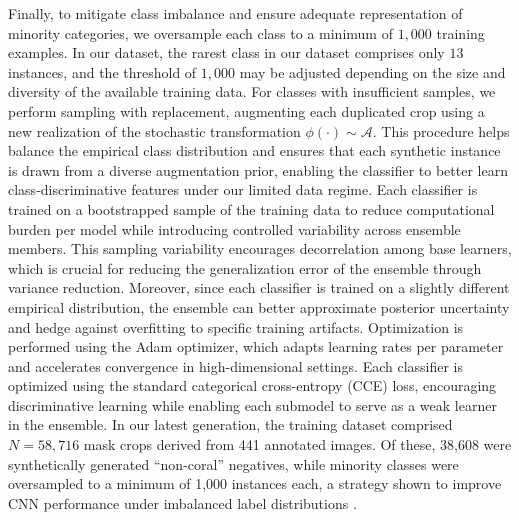 \documentclass[11pt]{elsarticle}
\begin{document}
Finally, to mitigate class imbalance and ensure adequate representation of minority categories, we oversample each class to a minimum of $1{,}000$ training examples. In our dataset, the rarest class in our dataset comprises only $13$ instances, and the threshold of $1,000$ may be adjusted depending on the size and diversity of the available training data. For classes with insufficient samples, we perform sampling with replacement, augmenting each duplicated crop using a new realization of the stochastic transformation $\phi(\cdot) \sim \mathcal{A}$. This procedure helps balance the empirical class distribution and ensures that each synthetic instance is drawn from a diverse augmentation prior, enabling the classifier to better learn class-discriminative features under our limited data regime. Each classifier is trained on a bootstrapped sample of the training data to reduce computational burden per model while introducing controlled variability across ensemble members. This sampling variability encourages decorrelation among base learners, which is crucial for reducing the generalization error of the ensemble through variance reduction. Moreover, since each classifier is trained on a slightly different empirical distribution, the ensemble can better approximate posterior uncertainty and hedge against overfitting to specific training artifacts. Optimization is performed using the Adam optimizer, which adapts learning rates per parameter and accelerates convergence in high-dimensional settings. Each classifier is optimized using the standard categorical cross-entropy (CCE) loss, encouraging discriminative learning while enabling each submodel to serve as a weak learner in the ensemble.  In our latest generation, the training dataset comprised $N=58{,}716$ mask crops derived from 441 annotated images. Of these, 38,608 were synthetically generated ``non-coral'' negatives, while minority classes were oversampled to a minimum of 1,000 instances each, a strategy shown to improve CNN performance under imbalanced label distributions \citep{buda2018}.
\end{document}
